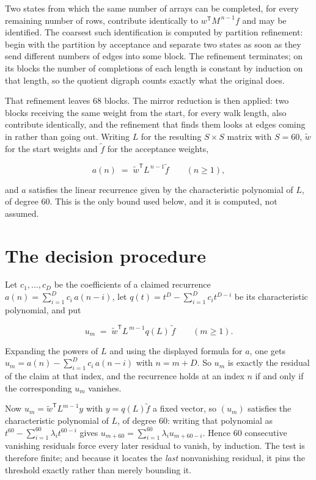 \documentclass[11pt]{article}
\theoremstyle{definition}
\begin{document}
Two states from which the same number of arrays can be completed, for every remaining number of rows, contribute identically to $w^{\mathsf T}M^{\,n-1}f$ and may be identified. The coarsest such identification is computed by partition refinement: begin with the partition by acceptance and separate two states as soon as they send different numbers of edges into some block. The refinement terminates; on its blocks the number of completions of each length is constant by induction on that length, so the quotient digraph counts exactly what the original does.

That refinement leaves $68$ blocks. The mirror reduction is then applied: two blocks receiving the same weight from the start, for every walk length, also contribute identically, and the refinement that finds them looks at edges coming in rather than going out. Writing $L$ for the resulting $S \times S$ matrix with $S = 60$, $\tilde w$ for the start weights and $\tilde f$ for the acceptance weights,

\[a(n) \;=\; \tilde w^{\mathsf T} L^{\,n-1} \tilde f \qquad (n \ge 1),\]

and $a$ satisfies the linear recurrence given by the characteristic polynomial of $L$, of degree $60$. This is the only bound used below, and it is computed, not assumed.

\section{The decision procedure}

Let $c_1,\dots,c_D$ be the coefficients of a claimed recurrence $a(n) = \sum_{i=1}^{D} c_i\,a(n-i)$, let $q(t) = t^{D} - \sum_{i=1}^{D} c_i t^{D-i}$ be its characteristic polynomial, and put

\[u_m \;=\; \tilde w^{\mathsf T} L^{\,m-1} q(L)\,\tilde f \qquad (m \ge 1).\]

Expanding the powers of $L$ and using the displayed formula for $a$, one gets $u_m = a(n) - \sum_{i=1}^{D} c_i\,a(n-i)$ with $n = m + D$. So $u_m$ is exactly the residual of the claim at that index, and the recurrence holds at an index $n$ if and only if the corresponding $u_m$ vanishes.

Now $u_m = \tilde w^{\mathsf T} L^{m-1} y$ with $y = q(L)\tilde f$ a fixed vector, so $(u_m)$ satisfies the characteristic polynomial of $L$, of degree $60$: writing that polynomial as $t^{60} - \sum_{i=1}^{60} \lambda_i t^{60-i}$ gives $u_{m+60} = \sum_{i=1}^{60} \lambda_i u_{m+60-i}$. Hence $60$ consecutive vanishing residuals force every later residual to vanish, by induction. The test is therefore finite; and because it locates the {\itshape last} nonvanishing residual, it pins the threshold exactly rather than merely bounding it.
\end{document}
